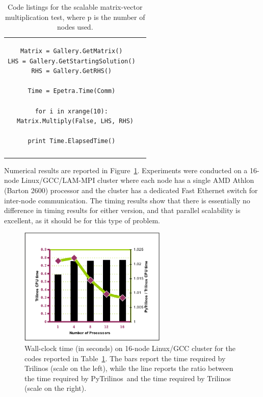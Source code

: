 \documentclass[acmtocl]{acmtrans2m}
\newcommand{\PyTrilinos}{{PyTrilinos}}
\begin{document}
\begin{table}
\begin{tabular}{| c  | c|}
\begin{minipage}{10.5cm}
\begin{verbatim}
Matrix = Gallery.GetMatrix()
LHS = Gallery.GetStartingSolution()
RHS = Gallery.GetRHS()

Time = Epetra.Time(Comm)

for i in xrange(10):
  Matrix.Multiply(False, LHS, RHS)

print Time.ElapsedTime()
\end{verbatim}
    \end{minipage}
    \\
    &  \\
    \hline
  \end{tabular}
  \caption{Code listings for the scalable matrix-vector multiplication
    test, where p is the number of nodes used.}
  \label{tab:code_parallel_matvec}
\end{table}

Numerical results are reported in
Figure~\ref{fig:time_parallel_matvec}.  Experiments were conducted on
a 16-node Linux/GCC/LAM-MPI cluster where each node has a single AMD
Athlon (Barton 2600) processor and the cluster has a dedicated Fast
Ethernet switch for inter-node communication.  The timing results show
that there is essentially no difference in timing results for either
version, and that parallel scalability is excellent, as it should be
for this type of problem.

\begin{figure}
  \begin{center}
    \includegraphics[width=7cm]{scalability-1k.eps}
    \caption{Wall-clock time (in seconds) on 16-node Linux/GCC cluster
      for the codes reported in Table~\ref{tab:code_parallel_matvec}.
      The bars report the time required by Trilinos (scale on the
      left), while the line reports the ratio between the time
      required by \PyTrilinos\ and the time required by Trilinos (scale
      on the right).}
    \label{fig:time_parallel_matvec}
  \end{center}
\end{figure}
%
\end{document}
